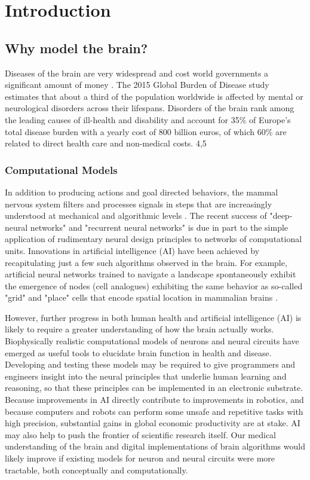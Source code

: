 \chapter{Introduction}
\section{Why model the brain?}
Diseases of the brain are very widespread and cost world governments a significant amount of money \citep{who}.
The 2015 Global Burden of Disease study estimates that about a third of the population worldwide is affected by mental or neurological disorders across their lifespans.
Disorders of the brain rank among the leading causes of ill-health and disability and account for 35\% of Europe’s total disease burden with a yearly cost of 800 billion euros, of which 60\% are related to direct health care and non-medical costs. 4,5 %
\subsection{Computational Models}
In addition to producing actions and goal directed behaviors, the mammal nervous system filters and processes signals in steps that are increasingly understood at mechanical and algorithmic levels \citep{marr1976understanding}.
The recent success of "deep-neural networks" and "recurrent neural networks" is due in part to the simple application of rudimentary neural design principles to networks of computational units.
Innovations in artificial intelligence (AI) have been achieved by recapitulating just a few such algorithms observed in the brain.
For example, artificial neural networks trained to navigate a landscape spontaneously exhibit the emergence of nodes (cell analogues) exhibiting the same behavior as so-called "grid" and "place" cells that encode spatial location in mammalian brains \citep{banino2018vector}.

However, further progress in both human health and artificial intelligence (AI) is likely to require a greater understanding of how the brain actually works.
Biophysically realistic computational models of neurons and neural circuits have emerged as useful tools to elucidate brain function in health and disease.
Developing and testing these models may be required to give programmers and engineers insight into the neural principles that underlie human learning and reasoning, so that these principles can be implemented in an electronic substrate.
Because improvements in AI directly contribute to improvements in robotics, and because computers and robots can perform some unsafe and repetitive tasks with high precision, substantial gains in global economic productivity are at stake.
AI may also help to push the frontier of scientific research itself.
Our medical understanding of the brain and digital implementations of brain algorithms would likely improve if existing models for neuron and neural circuits were more tractable, both conceptually and computationally.

